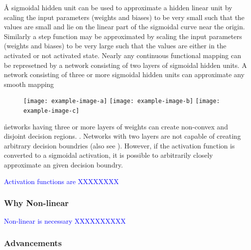 \r{A sigmoidal hidden unit can be used to approximate a hidden linear unit by scaling the input parameters (weights and biases) to be very small such that the values are small and lie on the linear part of the sigmoidal curve near the origin. Similarly a step function may be approximated by scaling the input parameters (weights and biases) to be very large such that the values are either in the activated or not activated state. Nearly any continuous functional mapping can be represetned by a network consisting of two layers of sigmoidal hidden units.  A network consisting of three or more sigmoidal hidden units can approximate any smooth mapping }


\begin{figure}[htp]
	\centering
	\texttt{[image: example-image-a]}\hfil
	\texttt{[image: example-image-b]}\hfil
	\texttt{[image: example-image-c]}\hfil
	\caption{}
	\label{fig:foundations_ann_layers_decision_region}
\end{figure}

\r{networks having three or more layers of weights can create non-convex and disjoint decision regions. . Networks with two layers are not capable of creating arbitrary decision boundries  (also see ). However, if the activation function is converted to a sigmoidal activation, it is possible to arbitrarily closely approximate an given decision boundry.}


\textcolor{blue}{Activation functions are XXXXXXXX}

\subsubsection{Why Non-linear}

\textcolor{blue}{Non-linear is necessary XXXXXXXXXX}

\subsubsection{Advancements}

